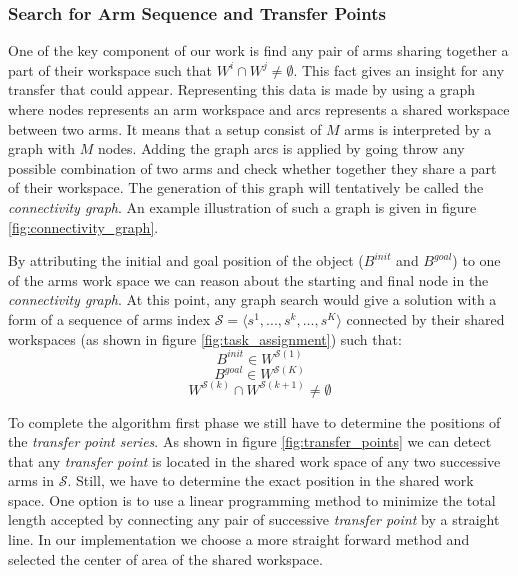 \documentclass[english]{article}
\theoremstyle{definition}
\begin{document}
\subsubsection*{Search for Arm Sequence and Transfer Points}

One of the key component of our work is find any pair of arms sharing together a part of their workspace such that $W^i \cap W^j \neq \emptyset$. This fact gives an insight for any transfer that could appear. Representing this data is made by using a graph where nodes represents an arm workspace and arcs represents a shared workspace between two arms. It means that a setup consist of $M$ arms is interpreted by a graph with $M$ nodes. Adding the graph arcs is applied by 
going throw any possible combination of two arms and check whether together they share a part of their workspace. The generation of this graph will tentatively be called the \textit{connectivity graph}. An example illustration of such a graph is given in figure \ref{fig:connectivity_graph}.

By attributing the initial and goal position of the object ($B^{init}$ and $B^{goal}$) to one of the arms work space we can reason about the starting and final node in the \textit{connectivity graph}. At this point, any graph search would give a solution with a form of a sequence of arms index $\mathcal{S} = \langle s^1,...,s^k,...,s^K \rangle$ connected by their shared workspaces (as shown in figure \ref{fig:task_assignment}) such that:
\begin{equation}
B^{init} \in W^{\mathcal{S}(1)}
\end{equation}
\begin{equation}
B^{goal} \in W^{\mathcal{S}(K)}
\end{equation}
\begin{equation}
W^{\mathcal{S}(k)}\cap W^{\mathcal{S}(k+1)}\neq \emptyset
\end{equation}

To complete the algorithm first phase we still have to determine the positions of the \textit{transfer point series}. As shown in figure \ref{fig:transfer_points} we can detect that any \textit{transfer point} is located in the shared work space of any two successive arms in $\mathcal{S}$. Still, we have to determine the exact position in the shared work space. One option is to use a linear programming method to minimize the total length accepted by connecting any pair of successive \textit{transfer point} by a straight line. In our implementation we choose a more straight forward method and selected the center of area of the shared workspace.
\end{document}
